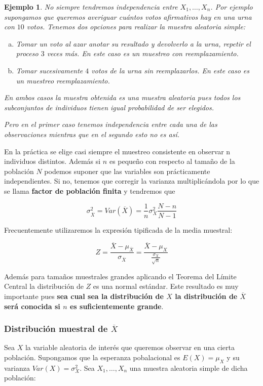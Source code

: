 \documentclass[12pt]{report}
\newtheorem{example}[definition]{Ejemplo}
\begin{document}
\begin{example}
No siempre tendremos independencia entre $X_{1},\ldots,X_{n}$.
 Por ejemplo  supongamos que queremos averiguar cuántos votos
 afirmativos hay en una urna con $10$ votos. Tenemos dos opciones para
 realizar la muestra aleatoria simple:

 \begin{enumerate}[a)]
 \item Tomar un voto al azar anotar su resultado y devolverlo a la urna,
 repetir el proceso $3$ veces más. En este caso es un muestreo con reemplazamiento.
 \item Tomar sucesivamente $4$ votos de la urna sin reemplazarlos.
 En este caso es un muestreo reemplazamiento.
 \end{enumerate}

 En ambos casos la muestra obtenida es una muestra aleatoria  pues todos los
 subconjuntos de individuos tienen igual probabilidad de ser elegidos.

 Pero en el primer caso tenemos independencia entre cada una de las
 observaciones mientras que en el segundo esto no es así.
\end{example}

 En la práctica se elige casi siempre el muestreo consistente en
 observar n individuos distintos. Además si  $n$ es pequeño con respecto al tamaño de la población $N$
 podemos suponer que las variables son prácticamente independientes.
 Si no, tenemos que corregir la varianza multiplicándola por lo que se
 llama \textbf{factor de población finita} y tendremos que

 $$\sigma_{\overline{X}}^2=Var(\overline{X})=\frac{1}{n} \sigma_{X}^2 \frac{N-n}{N-1}$$


 Frecuentemente utilizaremos la expresión tipificada de la media muestral:

 $$Z=\frac{\overline{X}-\mu_{\overline{X}}}{\sigma_{\overline{X}}}
 =\frac{\overline{X}-\mu_{X}}{\frac{\sigma_{X}}{\sqrt{n}}}$$

 Además para  tamaños muestrales grandes aplicando  el Teorema del Límite Central  la
 distribución de $Z$ es una normal estándar. Este resultado es muy importante
 pues \textbf{sea cual sea la distribución de $X$ la distribución de
  $\overline{X}$ será conocida si $n$ es suficientemente grande}.


\subsubsection{Distribución muestral de $\overline{X}$}
 Sea $X$ la variable aleatoria de interés que queremos observar en  una cierta población. Supongamos que 
 la esperanza pobalacional es  $E(X)=\mu_{X}$ y su  varianza $Var(X)=\sigma_{X}^2$. Sea
$X_{1},\ldots, X_{n}$ una muestra aleatoria simple de dicha población:
\end{document}
